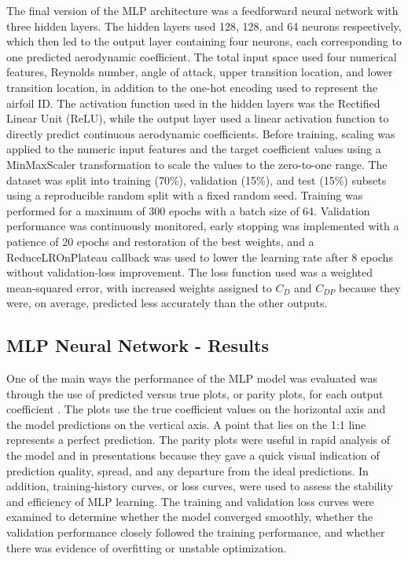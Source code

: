 The final version of the MLP architecture was a feedforward neural network with three hidden layers. The hidden layers used 128, 128, and 64 neurons respectively, which then led to the output layer containing four neurons, each corresponding to one predicted aerodynamic coefficient. The total input space used four numerical features, Reynolds number, angle of attack, upper transition location, and lower transition location, in addition to the one-hot encoding used to represent the airfoil ID. The activation function used in the hidden layers was the Rectified Linear Unit (ReLU), while the output layer used a linear activation function to directly predict continuous aerodynamic coefficients. Before training, scaling was applied to the numeric input features and the target coefficient values using a MinMaxScaler transformation to scale the values to the zero-to-one range. The dataset was split into training (70\%), validation (15\%), and test (15\%) subsets using a reproducible random split with a fixed random seed. Training was performed for a maximum of 300 epochs with a batch size of 64. Validation performance was continuously monitored, early stopping was implemented with a patience of 20 epochs and restoration of the best weights, and a ReduceLROnPlateau callback was used to lower the learning rate after 8 epochs without validation-loss improvement. The loss function used was a weighted mean-squared error, with increased weights assigned to $C_D$ and $C_{DP}$ because they were, on average, predicted less accurately than the other outputs.

\subsection{MLP Neural Network - Results}
One of the main ways the performance of the MLP model was evaluated was through the use of predicted versus true plots, or parity plots, for each output coefficient \cite{WadeProgressPresentation3_2025,WadeProgressPresentation4_2025}. The plots use the true coefficient values on the horizontal axis and the model predictions on the vertical axis. A point that lies on the 1:1 line represents a perfect prediction. The parity plots were useful in rapid analysis of the model and in presentations because they gave a quick visual indication of prediction quality, spread, and any departure from the ideal predictions. In addition, training-history curves, or loss curves, were used to assess the stability and efficiency of MLP learning. The training and validation loss curves were examined to determine whether the model converged smoothly, whether the validation performance closely followed the training performance, and whether there was evidence of overfitting or unstable optimization.

